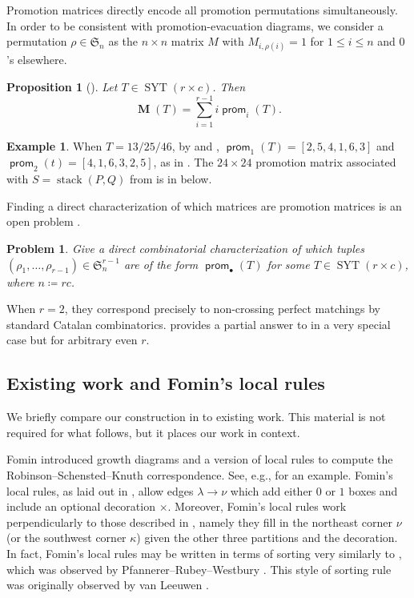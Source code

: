\documentclass{amsart}
\newtheorem{problem}[theorem]{Problem}
\newtheorem{proposition}[theorem]{Proposition}
\theoremstyle{definition}
\newtheorem{example}[theorem]{Example}
\DeclareMathOperator{\SYT}{SYT}
\DeclareMathOperator{\stack}{stack}
\DeclareMathOperator{\prom}{\mathsf{prom}}
\DeclareMathOperator{\PM}{\mathbf{M}}
\begin{document}
Promotion matrices directly encode all promotion permutations simultaneously. In order to be consistent with promotion-evacuation diagrams, we consider a permutation $\rho \in \mathfrak{S}_n$ as the $n \times n$ matrix $M$ with $M_{i,\rho(i)} = 1$ for $1 \leq i \leq n$ and $0$'s elsewhere.

\begin{proposition}[{\cite[Prop.~5.19]{fluctuating-paper}}]\label{prop:prom-matrix}
    Let $T \in \SYT(r \times c)$. Then
      \[ \PM(T) = \sum_{i=1}^{r-1} i \prom_i(T). \]
\end{proposition}

\begin{example}
    When $T = 13/25/46$, by  and , $\prom_1(T) = [2,5,4,1,6,3]$ and $\prom_2(t) = [4,1,6,3,2,5]$, as in . The $24 \times 24$ promotion matrix associated with $S = \stack(P, Q)$ from  is in  below.
\end{example}

Finding a direct characterization of which matrices are promotion matrices is an open problem \cite[Rem.~6.15]{fluctuating-paper}.

\begin{problem}\label{prob:prom-perms}
    Give a direct combinatorial characterization of which tuples $(\rho_1, \ldots, \rho_{r-1}) \in \mathfrak{S}_n^{r-1}$ are of the form $\prom_\bullet(T)$ for some $T \in \SYT(r \times c)$, where $n \coloneqq rc$.
\end{problem}

\noindent When $r=2$, they correspond precisely to non-crossing perfect matchings by standard Catalan combinatorics.  provides a partial answer to  in a very special case but for arbitrary even $r$.

\subsection{Existing work and Fomin's local rules}\label{sec:background-Fomin}

We briefly compare our construction in  to existing work. This material is not required for what follows, but it places our work in context.

Fomin \cite{Fomin-RSK} introduced growth diagrams and a version of local rules to compute the Robinson--Schensted--Knuth correspondence. See, e.g., \cite[Fig.~10]{Krattenthaler-growth-diagrams} for an example. Fomin's local rules, as laid out in \cite{Krattenthaler-growth-diagrams}, allow edges $\lambda \to \nu$ which add either $0$ or $1$ boxes and include an optional decoration $\times$. Moreover, Fomin's local rules work perpendicularly to those described in , namely they fill in the northeast corner $\nu$ (or the southwest corner $\kappa$) given the other three partitions and the decoration. In fact, Fomin's local rules may be written in terms of sorting very similarly to , which was observed by Pfannerer--Rubey--Westbury \cite[Fig.~3]{Pfannerer-Rubey-Westbury}. This style of sorting rule was originally observed by van Leeuwen \cite[Rule~4.1.1]{vanLeeuwen}.
\end{document}
